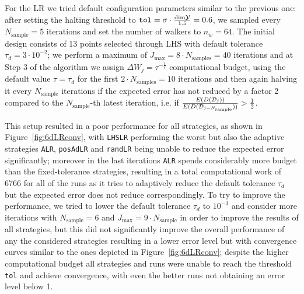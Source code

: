 For the LR we tried default configuration parameters similar to the previous one: after setting the halting threshold to $\texttt{tol} = \sigma \cdot \frac{\text{dim} \mathcal Y }{1.5} = 0.6$, we sampled every $N_{\text{sample}} = 5 $ iterations and set the number of walkers to $n_w = 64$.
The initial design consists of 13 points selected through LHS with default tolerance $\tau_d = 3 \cdot 10^{-2}$; we perform a maximum of $J_{\max} = 8 \cdot N_{\text{samples}} = 40$ iterations and at Step 3 of the algorithm we assign $\Delta W_j = \tau ^{-\frac{l}{r}}$ computational budget, using the default value $\tau= \tau_d$ for the first $2\cdot N_{\text{samples}}= 10$ iterations and then again halving it every $N_{\text{sample}}$ iterations if the expected error has not reduced by a factor 2 compared to the $N_{\text{sample}}$-th latest iteration, i.e. if $\frac{E(D(\mathcal D_j))}{E(D(\mathcal D_{j-N_{\text{sample}}}))} > \frac{1}{2}$.

This setup resulted in a poor performance for all strategies, as shown in Figure~\ref{fig:6dLRconv}, with \texttt{LHSLR} performing the worst but also the adaptive strategies \texttt{ALR}, \texttt{posAdLR} and \texttt{randLR} being unable to reduce the expected error significantly; moreover in the last iterations \texttt{ALR} spends considerably more budget than the fixed-tolerance strategies, resulting in a total computational work of 6766 for all of the runs as it tries to adaptively reduce the default tolerance $\tau_d$ but the expected error does not reduce correspondingly.
To try to improve the performance, we tried to lower the default tolerance $\tau_d$ to $10^{-3}$ and consider more iterations with $N_{\text{sample}} =  6$ and $J_{\max} = 9 \cdot N_{\text{sample}} $ in order to improve the results of all strategies, but this did not significantly improve the overall performance of any the considered strategies resulting in a lower error level but with convergence curves similar to the ones depicted in Figure~\ref{fig:6dLRconv}; despite the higher computational budget all strategies and runs were unable to reach the threshold \texttt{tol} and achieve convergence, with even the better runs not obtaining an error level below 1.

